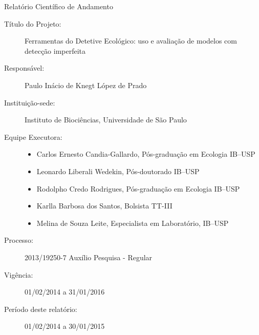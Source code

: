 \begin{center}
  {\LARGE Relatório Científico de Andamento} 
\end{center}
\begin{description}
\item[Título do Projeto:] Ferramentas do Detetive Ecológico: uso e avaliação de modelos com detecção imperfeita
\item[Responsável:] Paulo Inácio de Knegt López de Prado
\item[Instituição-sede:] Instituto de Biociências, Universidade de São Paulo
\item[Equipe Executora:]
  \begin{itemize}
  \item Carlos Ernesto Candia-Gallardo, Pós-graduação em Ecologia IB--USP
  \item Leonardo Liberali Wedekin, Pós-doutorado IB--USP
  \item Rodolpho Credo Rodrigues, Pós-graduação em Ecologia IB--USP
  \item Karlla Barbosa dos Santos, Bolsista TT-III
  \item Melina de Souza Leite, Especialista em Laboratório, IB--USP
  \end{itemize}
\item[Processo:] 2013/19250-7 Auxílio Pesquisa - Regular 
\item[Vigência:] 01/02/2014 a 31/01/2016 
\item[Período deste relatório:] 01/02/2014 a 30/01/2015
\end{description}
